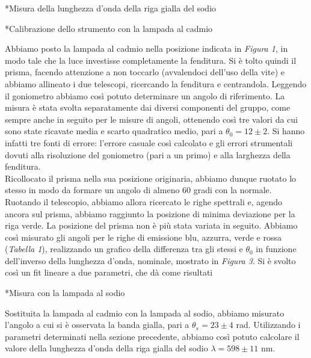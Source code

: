 \begin{section}*{Misura della lunghezza d'onda della riga gialla del sodio}

\begin{subsection}*{Calibrazione dello strumento con la lampada al cadmio}

Abbiamo posto la lampada al cadmio nella posizione indicata in \emph{Figura 1}, in modo tale che la luce investisse completamente la fenditura. Si è tolto quindi il prisma, facendo attenzione a non toccarlo (avvalendoci dell'uso della vite) e abbiamo allineato i due telescopi, ricercando la fenditura e centrandola. Leggendo il goniometro abbiamo così potuto determinare un angolo di riferimento. La misura è stata svolta separatamente dai diversi componenti del gruppo, come sempre anche in seguito per le misure di angoli, ottenendo così tre valori da cui sono state ricavate media e scarto quadratico medio, pari a $\theta_{0} = 12 \pm 2$. Si hanno infatti tre fonti di errore: l'errore casuale così calcolato e gli errori strumentali dovuti alla risoluzione del goniometro (pari a un primo) e alla larghezza della fenditura.\\ %
Ricollocato il prisma nella sua posizione originaria, abbiamo dunque ruotato lo stesso in modo da formare un angolo di almeno 60 gradi con la normale. Ruotando il telescopio, abbiamo allora ricercato le righe spettrali e, agendo ancora sul prisma, abbiamo raggiunto la posizione di minima deviazione per la riga verde. La posizione del prisma non è più stata variata in seguito. Abbiamo così misurato gli angoli per le righe di emissione blu, azzurra, verde e rossa (\emph{Tabella 1}), realizzando un grafico della differenza tra gli stessi e $\theta_{0}$ in funzione dell'inverso della lunghezza d'onda, nominale, mostrato in \emph{Figura 3}. Si è svolto così un fit lineare a due parametri, che dà come risultati  \\ %

\end{subsection}

\begin{subsection}*{Misura con la lampada al sodio}

Sostituita la lampada al cadmio con la lampada al sodio, abbiamo misurato l'angolo a cui si è osservata la banda gialla, pari a $\theta_{s} = 23 \pm 4$ rad. Utilizzando i parametri determinati nella sezione precedente, abbiamo così potuto calcolare il valore della lunghezza d'onda della riga gialla del sodio $\lambda = 598 \pm 11$ nm.

\end{subsection}

\end{section}

